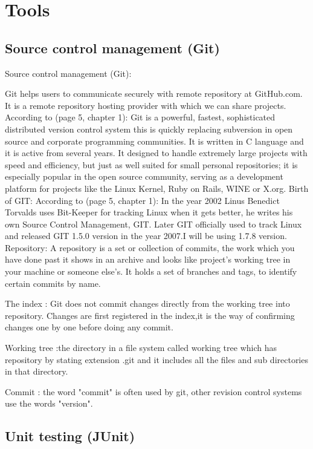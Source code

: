 \documentclass{report}
\begin{document}
\section{Tools}
\label{sec:Tools}

\subsection{Source control management (Git)}
\label{sec:scm}

Source control management (Git):

Git helps users to communicate securely with remote repository at GitHub.com. It is a remote repository hosting provider with which we can share projects.	
According to \cite{Chacon2011ProGit} (page 5, chapter 1): Git is a powerful, fastest, sophisticated distributed version control system this is quickly replacing subversion in open source and corporate programming communities. It is written in C language and it is active from several years. It designed to handle extremely large projects with speed and efficiency,	but just as well suited for small personal repositories; it is especially popular in the open source community, serving as a development platform for projects like the Linux Kernel, Ruby on Rails, WINE or X.org.
Birth of GIT:
According to \cite{Chacon2011ProGit}(page 5, chapter 1): In the year 2002 Linus Benedict Torvalds uses Bit-Keeper for tracking Linux when it gets better, he writes his own Source Control Management, GIT. Later GIT officially used to track Linux and released GIT 1.5.0 version in the year 2007.I will be using 1.7.8 version.
Repository:  A repository is a set or collection of commits, the work which you have done past it shows in an archive and looks like project's working tree in your machine or someone else's. It holds a set of branches and tags, to identify certain commits by name.

The index : Git does not commit changes directly from the working tree into repository. Changes are first registered in the index,it is the way of confirming changes one by one before doing any commit.																										

Working tree :the directory in a file system called working tree which has repository by stating extension .git and it includes all the files and sub directories in that  directory.

Commit : the word "commit" is often used by git, other revision control systems use the words "version".


\subsection{Unit testing (JUnit)}
\label{sec:junit}
\end{document}

